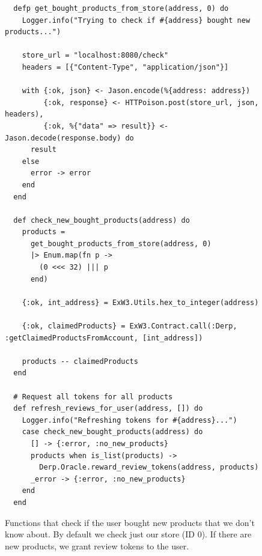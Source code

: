 \documentclass[12pt,a4paper,oneside]{article}
\theoremstyle{definition}
\begin{document}
\begin{figure}[H]
	\begin{verbatim}
  defp get_bought_products_from_store(address, 0) do
    Logger.info("Trying to check if #{address} bought new products...")

    store_url = "localhost:8080/check"
    headers = [{"Content-Type", "application/json"}]

    with {:ok, json} <- Jason.encode(%{address: address})
         {:ok, response} <- HTTPoison.post(store_url, json, headers),
         {:ok, %{"data" => result}} <- Jason.decode(response.body) do
      result
    else
      error -> error
    end 
  end

  def check_new_bought_products(address) do
    products =
      get_bought_products_from_store(address, 0)
      |> Enum.map(fn p -> 
        (0 <<< 32) ||| p
      end)

    {:ok, int_address} = ExW3.Utils.hex_to_integer(address)

    {:ok, claimedProducts} = ExW3.Contract.call(:Derp, :getClaimedProductsFromAccount, [int_address])

    products -- claimedProducts
  end

  # Request all tokens for all products
  def refresh_reviews_for_user(address, []) do
    Logger.info("Refreshing tokens for #{address}...")
    case check_new_bought_products(address) do
      [] -> {:error, :no_new_products}
      products when is_list(products) ->
        Derp.Oracle.reward_review_tokens(address, products)
      _error -> {:error, :no_new_products}
    end
  end
    \end{verbatim}
	\label{code:new-products-check}
	\caption{Functions that check if the user bought new products that we don't know about. By default we check just our store (ID 0). If there are new products, we grant review tokens to the user.}
\end{figure}
\end{document}
